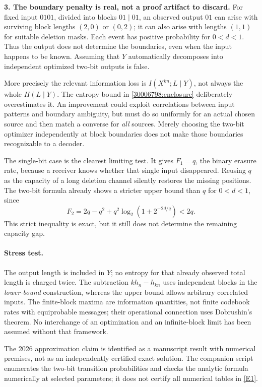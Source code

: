 \documentclass[11pt,a4paper]{article}
\newcommand{\eref}[2]{\hyperlink{extra:#1:#2}{[E#2]}}
\numberwithin{equation}{section}
\begin{document}
\textbf{3. The boundary penalty is real, not a proof artifact to discard.}
For fixed input $0101$, divided into blocks $01\mid01$, an observed
output $01$ can arise with surviving block lengths $(2,0)$ or $(0,2)$;
it can also arise with lengths $(1,1)$ for suitable deletion masks.
Each event has positive probability for $0<d<1$.
Thus the output does not determine the boundaries, even when the input
happens to be known. Assuming that $Y$ automatically decomposes into
independent optimized two-bit outputs is false.

More precisely the relevant information loss is
$I(X^{kn};L\mid Y)$, not always the whole $H(L\mid Y)$.
The entropy bound in \eqref{30006798:enclosure} deliberately overestimates it.
An improvement could exploit correlations between input patterns and
boundary ambiguity, but must do so uniformly for an actual chosen
source and then match a converse for \emph{all} sources. Merely choosing
the two-bit optimizer independently at block boundaries does not make
those boundaries recognizable to a decoder.

The single-bit case is the clearest limiting test. It gives
$F_1=q$, the binary erasure rate, because a receiver knows whether that
single input disappeared. Reusing $q$ as the capacity of a long deletion
channel silently restores the missing positions. The two-bit formula
already shows a stricter upper bound than $q$ for $0<d<1$, since
\[
 F_2=2q-q^2+q^2\log_2(1+2^{-2d/q})<2q.
\]
This strict inequality is exact, but it still does not determine the
remaining capacity gap.

\paragraph{Stress test.}
The output length is included in $Y$; no entropy for that already
observed total length is charged twice. The subtraction
$kh_n-h_{kn}$ uses independent blocks in the \emph{lower-bound}
construction, whereas the upper bound allows arbitrary correlated
inputs. The finite-block maxima are information quantities, not finite
codebook rates with equiprobable messages; their operational connection
uses Dobrushin's theorem. No interchange of an optimization and an
infinite-block limit has been assumed without that framework.

The 2026 approximation claim is identified as a manuscript result with
numerical premises, not as an independently certified exact solution.
The companion script enumerates the two-bit transition probabilities
and checks the analytic formula numerically at selected parameters; it
does not certify all numerical tables in \eref{30006798}{1}.
\end{document}
